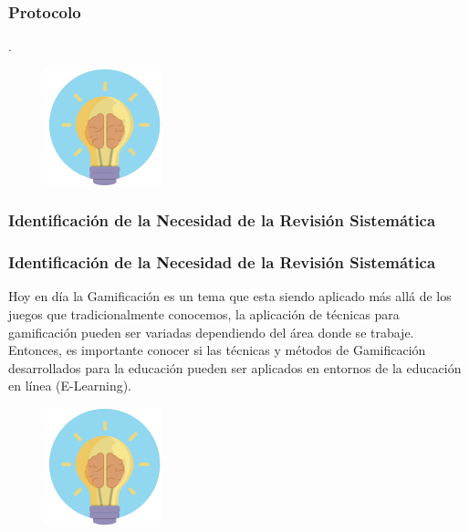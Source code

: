 \documentclass{beamer}
\begin{document}
\begin{frame}
    \frametitle{Protocolo}
    .
	\begin{figure}
		\begin{center}
			\includegraphics[scale=0.45]{images/2icons/need.png}
			\label{student}
		\end{center}
	\end{figure}
\end{frame}

\subsubsection{Identificación de la Necesidad de la Revisión Sistemática}
\begin{frame}
    \frametitle{Identificación de la Necesidad de la Revisión Sistemática}
    Hoy en día la Gamificación es un tema que esta siendo aplicado más allá de los juegos que tradicionalmente conocemos, la aplicación de técnicas para gamificación pueden ser variadas dependiendo del área donde se trabaje. Entonces, es importante conocer si las técnicas y métodos de Gamificación desarrollados para la educación pueden ser aplicados en entornos de la educación en línea (E-Learning).
	\begin{figure}
		\begin{center}
			\includegraphics[scale=0.45]{images/2icons/need.png}
			\label{student}
		\end{center}
	\end{figure}
\end{frame}

\end{document}
